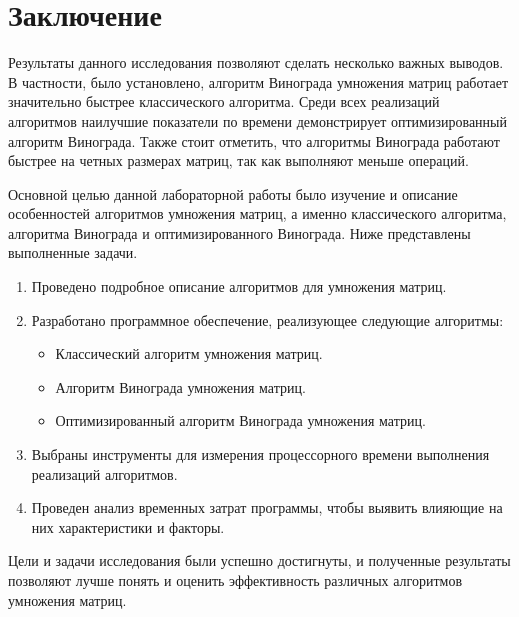\chapter*{Заключение}

Результаты данного исследования позволяют сделать несколько важных выводов. 
В частности, было установлено, алгоритм Винограда умножения матриц работает значительно быстрее классического алгоритма.
Среди всех реализаций алгоритмов наилучшие показатели по времени демонстрирует оптимизированный алгоритм Винограда.
Также стоит отметить, что алгоритмы Винограда работают быстрее на четных размерах матриц, так как выполняют меньше операций.

Основной целью данной лабораторной работы было изучение и описание особенностей алгоритмов умножения матриц, а именно классического алгоритма, алгоритма Винограда и оптимизированного Винограда.
Ниже представлены выполненные задачи.

\begin{enumerate}
\item Проведено подробное описание алгоритмов для умножения матриц.
\item Разработано программное обеспечение, реализующее следующие алгоритмы:
\begin{itemize}[label=---]
\item Классический алгоритм умножения матриц.
\item Алгоритм Винограда умножения матриц.
\item Оптимизированный алгоритм Винограда умножения матриц.
\end{itemize}
\item Выбраны инструменты для измерения процессорного времени выполнения реализаций алгоритмов.
\item Проведен анализ временных затрат программы, чтобы выявить влияющие на них характеристики и факторы.
\end{enumerate}

Цели и задачи исследования были успешно достигнуты, и полученные результаты позволяют лучше понять и оценить эффективность различных алгоритмов умножения матриц.